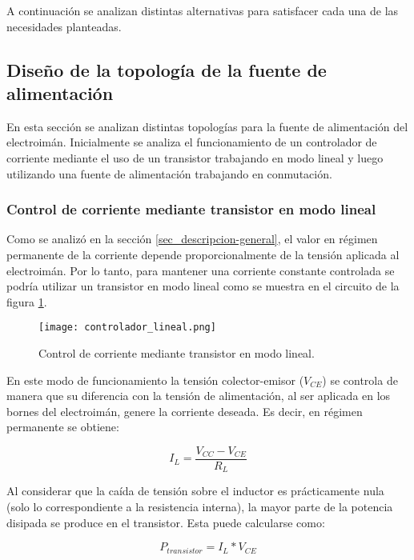 A continuación se analizan distintas alternativas para satisfacer cada una de las necesidades planteadas.

\subsection{Diseño de la topología de la fuente de alimentación}
En esta sección se analizan distintas topologías para la fuente de alimentación del electroimán. Inicialmente se analiza el funcionamiento de un controlador de corriente mediante el uso de un transistor trabajando en modo lineal y luego utilizando una fuente de alimentación trabajando en conmutación.

\subsubsection{Control de corriente mediante transistor en modo lineal}
Como se analizó en la sección \ref{sec_descripcion-general}, el valor en régimen permanente de la corriente depende proporcionalmente de la tensión aplicada al electroimán. Por lo tanto, para mantener una corriente constante controlada se podría utilizar un transistor en modo lineal como se muestra en el circuito de la figura \ref{fig:img_controlador-lineal}.

\begin{figure}[H]
	\centering
	\texttt{[image: controlador\_lineal.png]}
	\caption{Control de corriente mediante transistor en modo lineal.}
	\label{fig:img_controlador-lineal}
\end{figure}

En este modo de funcionamiento la tensión colector-emisor ($V_{CE}$) se controla de manera que su diferencia con la tensión de alimentación, al ser aplicada en los bornes del electroimán, genere la corriente deseada. Es decir, en régimen permanente se obtiene:
 
 \begin{equation}
 	I_L=\frac{V_{CC}-V_{CE}}{R_L}
 \end{equation}


Al considerar que la caída de tensión sobre el inductor es prácticamente nula (solo lo correspondiente a la resistencia interna), la mayor parte de la potencia disipada se produce en el transistor. Esta puede calcularse como: 

\begin{equation}
	P_{transistor} = I_L*V_{CE}
\end{equation}


